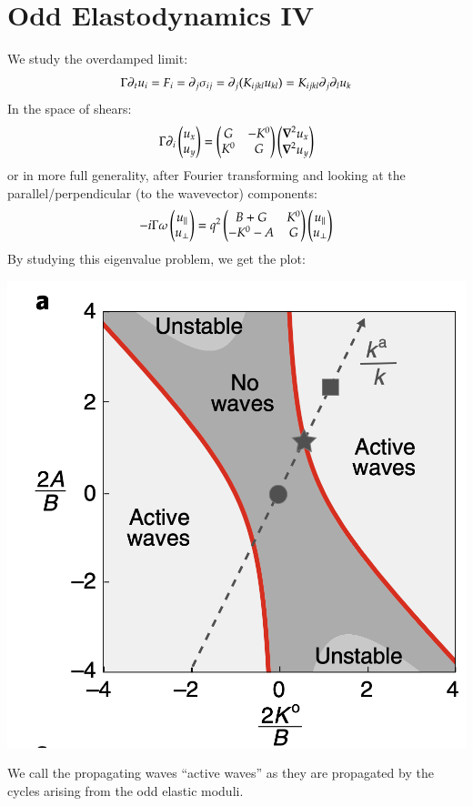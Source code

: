 \section{Odd Elastodynamics IV}

We study the overdamped limit:
\begin{equation}
    \Gamma \partial_t u_i = F_i = \partial_j \sigma_{ij} = \partial_j (K_{ijkl}u_{kl}) = K_{ijkl}\partial_j\partial_l u_k
\end{equation}
In the space of shears:
\begin{equation}
    \Gamma \p_i \m{u_x \\ u_y} = \m{G & -K^0 \\ K^0 & G}\m{\nabla^2 u_x \\ \nabla^2 u_y}
\end{equation}
or in more full generality, after Fourier transforming and looking at the parallel/perpendicular (to the wavevector) components:
\begin{equation}\label{eq:dynamical}
    -i\Gamma \omega\begin{pmatrix}u_\parallel \\ u_\perp\end{pmatrix}  = q^2\begin{pmatrix}B + G & K^0 \\ -K^0 - A & G\end{pmatrix}\begin{pmatrix}u_\parallel \\ u_\perp\end{pmatrix}
\end{equation}
By studying this eigenvalue problem, we get the plot:
\begin{center}
    \includegraphics[scale=0.5]{Lectures/Images/lec6-oddelasticphasediagram.png}
\end{center}
We call the propagating waves ``active waves'' as they are propagated by the cycles arising from the odd elastic moduli.

